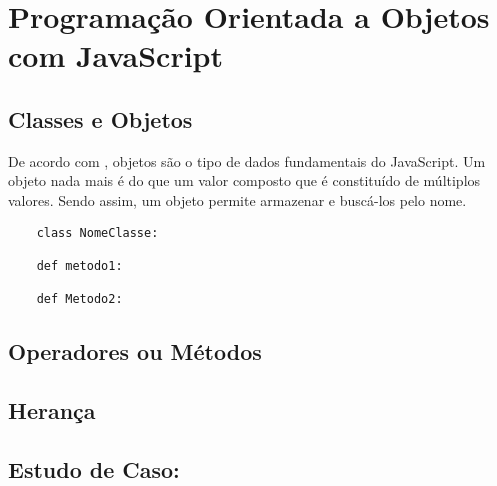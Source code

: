 

\chapter{ Programa\c{c}\~{a}o Orientada a Objetos com JavaScript}



    \section{Classes e Objetos}
De acordo com \cite{flanagan2020javascript}, objetos são o tipo de dados fundamentais do JavaScript. Um objeto nada mais é do que um valor composto que é constituído de múltiplos valores. Sendo assim, um objeto permite armazenar e buscá-los pelo nome.

   \begin{lstlisting}
    class NomeClasse:

    def metodo1:

    def Metodo2:

    \end{lstlisting}

    \section{Operadores ou M\'{e}todos}


    \section{Heran\c{c}a}


    \section{Estudo de Caso: }
